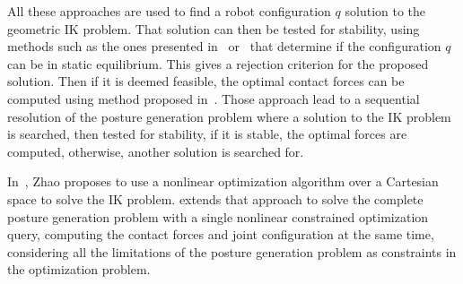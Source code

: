 All these approaches are used to find a robot configuration $q$ solution to the geometric IK problem.
That solution can then be tested for stability, using methods such as the ones presented in~\cite{bretl:itro:2008} or~\cite{rimon2008general} that determine if the configuration $q$ can be in static equilibrium.
This gives a rejection criterion for the proposed solution.
Then if it is deemed feasible, the optimal contact forces can be computed using method proposed in~\cite{boyd2007fast}.
Those approach lead to a sequential resolution of the posture generation problem where a solution to the IK problem is searched, then tested for stability, if it is stable, the optimal forces are computed, otherwise, another solution is searched for.

In~\cite{Zhao1994}, Zhao proposes to use a nonlinear optimization algorithm over a Cartesian space to solve the IK problem.
\cite{bouyarmane2010static} extends that approach to solve the complete posture generation problem with a single nonlinear constrained optimization query, computing the contact forces and joint configuration at the same time, considering all the limitations of the posture generation problem as constraints in the optimization problem.






